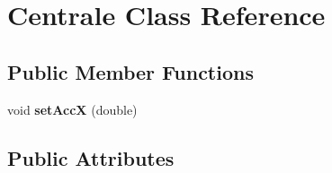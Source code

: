 \hypertarget{class_centrale}{\section{Centrale Class Reference}
\label{class_centrale}
}
\subsection*{Public Member Functions}
\begin{DoxyCompactItemize}
\item 
\hypertarget{class_centrale_aff05268b8cd4ea2f8a43b5ad90146ac2}{void {\bfseries set\-Acc\-X} (double)}\label{class_centrale_aff05268b8cd4ea2f8a43b5ad90146ac2}

\end{DoxyCompactItemize}
\subsection*{Public Attributes}
